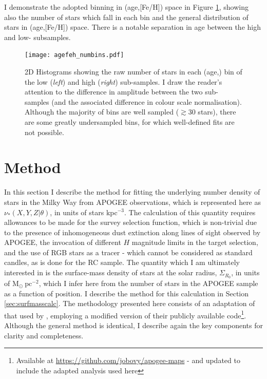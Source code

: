 I demonstrate the adopted binning in (age,[Fe/H]) space in Figure \ref{fig:numbins}, showing also the number of stars which fall in each bin and the general distribution of stars in (age,[Fe/H]) space. There is a notable separation in age between the high and low-\afe{} subsamples. 


 \begin{figure}
 	\texttt{[image: agefeh\_numbins.pdf]}
     \caption[2D Histogram demonstrating the number of stars in each age and \feh{} bin, in the high and low-\afe{} populations, adopted for modelling the stellar density in the disc]{2D Histograms showing the raw number of stars in each (age,\feh{}) bin of the low (\emph{left}) and high (\emph{right}) \afe{} sub-samples. I draw the reader's attention to the difference in amplitude between the two sub-samples (and the associated difference in colour scale normalisation). Although the majority of bins are well sampled ($\gtrsim 30$ stars), there are some greatly undersampled bins, for which well-defined fits are not possible. }
    \label{fig:numbins}
 \end{figure}

 \section{Method}
 \label{sec:methoda}
 In this section I describe the method for fitting the underlying number density of stars in the Milky Way from APOGEE observations, which is represented here as $\nu_*(X,Y,Z|\theta)$, in units of stars kpc$^{-3}$. The calculation of this quantity requires allowances to be made for the survey selection function, which is non-trivial due to the presence of inhomogeneous dust extinction along lines of sight observed by APOGEE, the invocation of different $H$ magnitude limits in the target selection, and the use of RGB stars as a tracer - which cannot be considered as standard candles, as is done for the RC sample. The quantity which I am ultimately interested in is the surface-mass density of stars at the solar radius, $\Sigma_{R_0}$, in units of $\mathrm{M_{\odot}}\ \mathrm{pc^{-2}}$, which I infer here from the number of stars in the APOGEE sample as a function of position. I describe the method for this calculation in Section \ref{sec:surfmasscalc}. The methodology presented here consists of an adaptation of that used by \citet{2016ApJ...823...30B}, employing a modified version of their publicly available code\footnote{Available at \url{https://github.com/jobovy/apogee-maps} - and updated to include the adapted analysis used here}. Although the general method is identical, I describe again the key components for clarity and completeness.

